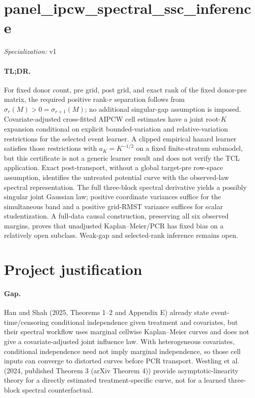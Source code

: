 \documentclass{article}
\begin{document}
\sloppy

\section*{panel\_\allowbreak{}ipcw\_\allowbreak{}spectral\_\allowbreak{}ssc\_\allowbreak{}inference}

\noindent\textit{Specialization:} v1\par

\paragraph{TL;DR.} For fixed donor count, pre grid, post grid, and exact rank of the fixed donor-pre matrix, the required positive rank-\(r\) separation follows from \(\sigma_r(M)>0=\sigma_{r+1}(M)\); no additional singular-gap assumption is imposed. Covariate-adjusted cross-fitted AIPCW cell estimates have a joint root-\(K\) expansion conditional on explicit bounded-variation and relative-variation restrictions for the selected event learner. A clipped empirical hazard learner satisfies those restrictions with \(a_K=K^{-1/2}\) on a fixed finite-stratum submodel, but this certificate is not a generic learner result and does not verify the TCL application. Exact post-transport, without a global target-pre row-space assumption, identifies the untreated potential curve with the observed-law spectral representation. The full three-block spectral derivative yields a possibly singular joint Gaussian law; positive coordinate variances suffice for the simultaneous band and a positive grid-RMST variance suffices for scalar studentization. A full-data causal construction, preserving all six observed margins, proves that unadjusted Kaplan--Meier/PCR has fixed bias on a relatively open subclass. Weak-gap and selected-rank inference remains open.

\section{Project justification}

\paragraph{Gap.} Han and Shah (2025, Theorems 1--2 and Appendix E) already state event-time/censoring conditional independence given treatment and covariates, but their spectral workflow uses marginal cellwise Kaplan--Meier curves and does not give a covariate-adjusted joint influence law. With heterogeneous covariates, conditional independence need not imply marginal independence, so those cell inputs can converge to distorted curves before PCR transport. Westling et al. (2024, published Theorem 3 (arXiv Theorem 4)) provide asymptotic-linearity theory for a directly estimated treatment-specific curve, not for a learned three-block spectral counterfactual.
\end{document}
